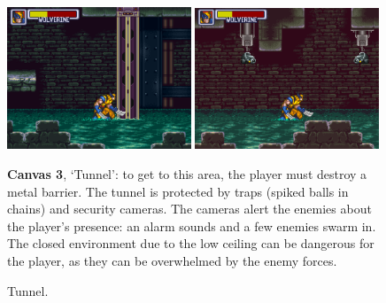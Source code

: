 \documentclass[english]{textolivre}
\begin{document}
\begin{figure}[htbp]
\begin{minipage}[t]{.47\textwidth}
\vspace{0pt}
\includegraphics[width=0.49\textwidth]{fig-008.png}
\hfill
\includegraphics[width=0.49\textwidth]{fig-009.png}
\caption{Tunnel.}
\label{fig-008e009}
\end{minipage}
\hfill
\begin{minipage}[t]{.47\textwidth}
\vspace{2pt}
\textbf{Canvas 3}, ‘Tunnel’: to get to this area, the player must destroy a metal barrier. The tunnel is protected by traps (spiked balls in chains) and security cameras. The cameras alert the enemies about the player's presence: an alarm sounds and a few enemies swarm in. The closed environment due to the low ceiling can be dangerous for the player, as they can be overwhelmed by the enemy forces.
\end{minipage}
\end{figure}
\end{document}
